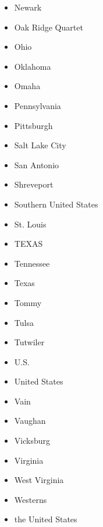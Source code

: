 \documentclass[12pt,a4paper]{article}
\begin{document}
\begin{itemize}
  \item Newark
  \item Oak Ridge Quartet
  \item Ohio
  \item Oklahoma
  \item Omaha
  \item Pennsylvania
  \item Pittsburgh
  \item Salt Lake City
  \item San Antonio
  \item Shreveport
  \item Southern United States
  \item St. Louis
  \item TEXAS
  \item Tennessee
  \item Texas
  \item Tommy
  \item Tulsa
  \item Tutwiler
  \item U.S.
  \item United States
  \item Vain
  \item Vaughan
  \item Vicksburg
  \item Virginia
  \item West Virginia
  \item Westerns
  \item the United States
\end{itemize}
\end{document}

